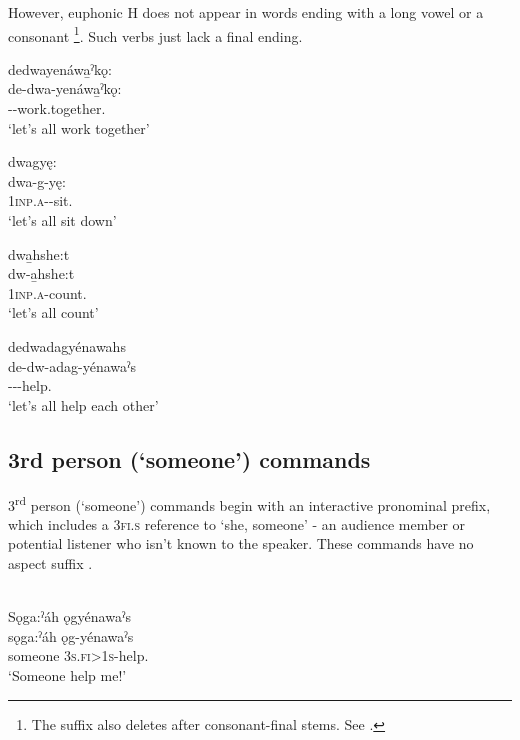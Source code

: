 However, euphonic H does not appear in words ending with a long vowel  or a consonant \footnote{The  {\punctual} suffix also deletes after consonant-final stems. See .}. Such verbs just lack a final  \textsc{\punctual} ending.

\ea\label{ex:commandex10} {}
\ea dedwayenáwa̱ˀkǫ:\\
\gll de-dwa-yenáwa̱ˀkǫ:\\
{\dualic}--work.together.{\noaspect}\\
\glt ‘let’s all work together’


\ex dwagyę:\\
\gll dwa-g-yę:\\
\textsc{1inp.a}-{\semireflexive}-sit.{\noaspect}\\
\glt ‘let’s all sit down’
\z
\z

\ea\label{ex:commandex11} {}
\ea dwa̱hshe:t \\
\gll dw-a̱hshe:t\\
 \textsc{1inp.a}-count.{\noaspect} \\
\glt `let’s all count'

\ex dedwadagyénawahs\\
\gll de-dw-adag-yénawaˀs\\
 {\dualic}--{}-help.{\noaspect}\\
\glt `let’s all help each other'
\z
\z


\subsection{3rd person (‘someone’) commands} \label{3rd person (‘someone’) commands}
3\textsuperscript{rd} person (‘someone’) commands begin with an interactive pronominal prefix, which includes a \textsc{3fi.s} reference to ‘she, someone’ - an audience member or potential listener who isn't known to the speaker. These commands have no aspect suffix . 

\ea\label{ex:commandex14} {}\\
Sǫga:ˀáh ǫgyénawaˀs  \\
\gll sǫga:ˀáh ǫg-yénawaˀs\\
someone \textsc{3s.fi>1s}-help.{\noaspect}\\
\glt ‘Someone help me!’
\z


